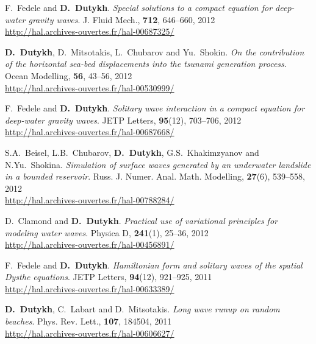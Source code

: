 \documentclass[final, a4paper, oneside, 12pt]{article}
\numberwithin{equation}{section}
\begin{document}
\begin{etaremune}

  \item F.~Fedele and \textbf{D.~Dutykh}. \textit{Special solutions to a compact equation for deep-water gravity waves}. J. Fluid Mech., \textbf{712}, 646--660, 2012 \\ %
  \url{http://hal.archives-ouvertes.fr/hal-00687325/}

  \item \textbf{D.~Dutykh}, D.~Mitsotakis, L.~Chubarov and Yu.~Shokin. \textit{On the contribution of the horizontal sea-bed displacements into the tsunami generation process}. Ocean Modelling, \textbf{56}, 43--56, 2012 \\ %
  \url{http://hal.archives-ouvertes.fr/hal-00530999/}
  
 \item F.~Fedele and \textbf{D.~Dutykh}. \textit{Solitary wave interaction in a compact equation for deep-water gravity waves}. JETP Letters, \textbf{95}(12), 703--706, 2012 \\ %
  \url{http://hal.archives-ouvertes.fr/hal-00687668/}

  \item S.A.~Beisel, L.B.~Chubarov, \textbf{D.~Dutykh}, G.S.~Khakimzyanov and N.Yu.~Shokina. \textit{Simulation of surface waves generated by an underwater landslide in a bounded reservoir}. Russ. J. Numer. Anal. Math. Modelling, \textbf{27}(6), 539--558, 2012 \\ %
  \url{http://hal.archives-ouvertes.fr/hal-00788284/}

  \item D.~Clamond and \textbf{D.~Dutykh}. \textit{Practical use of variational principles for modeling water waves}. Physica D, \textbf{241}(1), 25--36, 2012 \\ %
  \url{http://hal.archives-ouvertes.fr/hal-00456891/}


  \item F.~Fedele and \textbf{D.~Dutykh}. \textit{Hamiltonian form and solitary waves of the spatial Dysthe equations}. JETP Letters, \textbf{94}(12), 921--925, 2011 \\ %
  \url{http://hal.archives-ouvertes.fr/hal-00633389/}

  \item \textbf{D.~Dutykh}, C.~Labart and D.~Mitsotakis. \textit{Long wave runup on random beaches}. Phys. Rev. Lett., \textbf{107}, 184504, 2011 \\ %
  \url{http://hal.archives-ouvertes.fr/hal-00606627/}
  

\end{etaremune}
\end{document}
